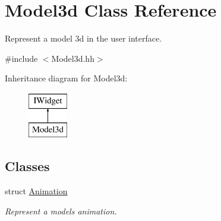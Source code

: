 \hypertarget{classModel3d}{}\section{Model3d Class Reference}
\label{classModel3d}


Represent a model 3d in the user interface.  




{\ttfamily \#include $<$Model3d.\+hh$>$}

Inheritance diagram for Model3d\+:\begin{figure}[H]
\begin{center}
\leavevmode
\includegraphics[height=2.000000cm]{classModel3d}
\end{center}
\end{figure}
\subsection*{Classes}
\begin{DoxyCompactItemize}
\item 
struct \hyperlink{structModel3d_1_1Animation}{Animation}
\begin{DoxyCompactList}\small\item\em Represent a model\textquotesingle{}s animation. \end{DoxyCompactList}\end{DoxyCompactItemize}
